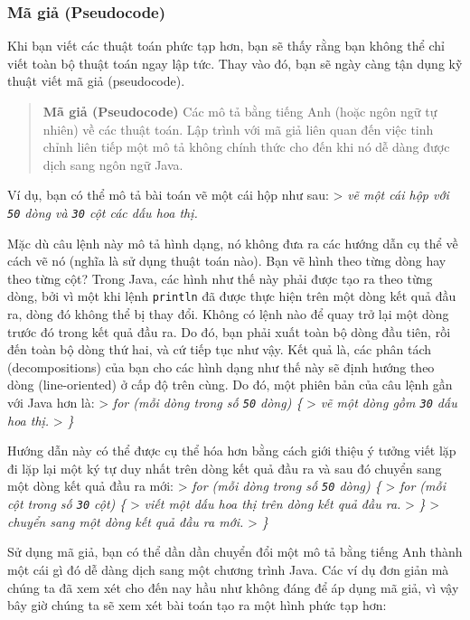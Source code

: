 \subsubsection{Mã giả (Pseudocode)}\label{muxe3-giux1ea3-pseudocode}

Khi bạn viết các thuật toán phức tạp hơn, bạn sẽ thấy rằng bạn không thể
chỉ viết toàn bộ thuật toán ngay lập tức. Thay vào đó, bạn sẽ ngày càng
tận dụng kỹ thuật viết mã giả (pseudocode).

\begin{quote}
\textbf{Mã giả (Pseudocode)} Các mô tả bằng tiếng Anh (hoặc ngôn ngữ tự
nhiên) về các thuật toán. Lập trình với mã giả liên quan đến việc tinh
chỉnh liên tiếp một mô tả không chính thức cho đến khi nó dễ dàng được
dịch sang ngôn ngữ Java.
\end{quote}

Ví dụ, bạn có thể mô tả bài toán vẽ một cái hộp như sau: \textgreater{}
\emph{vẽ một cái hộp với \texttt{50} dòng và \texttt{30} cột các dấu hoa
thị.}

Mặc dù câu lệnh này mô tả hình dạng, nó không đưa ra các hướng dẫn cụ
thể về cách vẽ nó (nghĩa là sử dụng thuật toán nào). Bạn vẽ hình theo
từng dòng hay theo từng cột? Trong Java, các hình như thế này phải được
tạo ra theo từng dòng, bởi vì một khi lệnh \texttt{println} đã được thực
hiện trên một dòng kết quả đầu ra, dòng đó không thể bị thay đổi. Không
có lệnh nào để quay trở lại một dòng trước đó trong kết quả đầu ra. Do
đó, bạn phải xuất toàn bộ dòng đầu tiên, rồi đến toàn bộ dòng thứ hai,
và cứ tiếp tục như vậy. Kết quả là, các phân tách (decompositions) của
bạn cho các hình dạng như thế này sẽ định hướng theo dòng
(line-oriented) ở cấp độ trên cùng. Do đó, một phiên bản của câu lệnh
gần với Java hơn là: \textgreater{} \emph{for (mỗi dòng trong số
\texttt{50} dòng) \{} \textgreater{} \emph{vẽ một dòng gồm \texttt{30}
dấu hoa thị.} \textgreater{} \emph{\}}

Hướng dẫn này có thể được cụ thể hóa hơn bằng cách giới thiệu ý tưởng
viết lặp đi lặp lại một ký tự duy nhất trên dòng kết quả đầu ra và sau
đó chuyển sang một dòng kết quả đầu ra mới: \textgreater{} \emph{for
(mỗi dòng trong số \texttt{50} dòng) \{} \textgreater{} \emph{for (mỗi
cột trong số \texttt{30} cột) \{} \textgreater{} \emph{viết một dấu hoa
thị trên dòng kết quả đầu ra.} \textgreater{} \emph{\}} \textgreater{}
\emph{chuyển sang một dòng kết quả đầu ra mới.} \textgreater{} \emph{\}}

Sử dụng mã giả, bạn có thể dần dần chuyển đổi một mô tả bằng tiếng Anh
thành một cái gì đó dễ dàng dịch sang một chương trình Java. Các ví dụ
đơn giản mà chúng ta đã xem xét cho đến nay hầu như không đáng để áp
dụng mã giả, vì vậy bây giờ chúng ta sẽ xem xét bài toán tạo ra một hình
phức tạp hơn:

